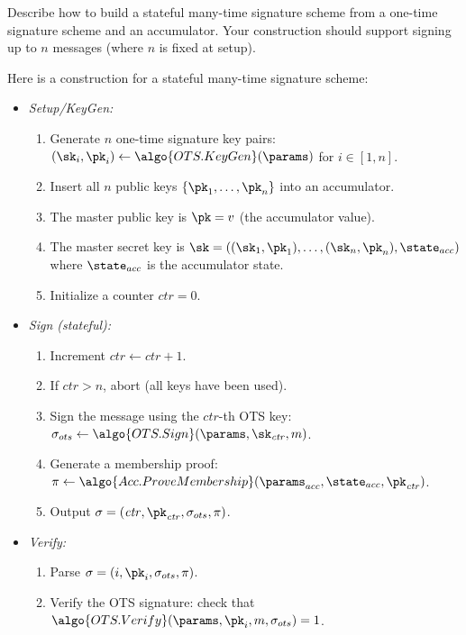 \begin{exercise}[Optional]
  Describe how to build a stateful many-time signature scheme from a one-time signature scheme and an accumulator.
  Your construction should support signing up to $n$ messages (where $n$ is fixed at setup).
\end{exercise}

\ifsolutions
\begin{mysolution}
  Here is a construction for a stateful many-time signature scheme:
  \begin{itemize}
    \item \emph{Setup/KeyGen:} 
      \begin{enumerate}
        \item Generate $n$ one-time signature key pairs: $(\sk_i, \pk_i) \gets \algo{OTS.KeyGen}(\params)$ for $i \in [1,n]$.
        \item Insert all $n$ public keys $\{\pk_1, \ldots, \pk_n\}$ into an accumulator.
        \item The master public key is $\pk = v$ (the accumulator value).
        \item The master secret key is $\sk = ((\sk_1, \pk_1), \ldots, (\sk_n, \pk_n), \state_{acc})$ where $\state_{acc}$ is the accumulator state.
        \item Initialize a counter $\mathit{ctr} = 0$.
      \end{enumerate}
    \item \emph{Sign (stateful):}
      \begin{enumerate}
        \item Increment $\mathit{ctr} \gets \mathit{ctr} + 1$.
        \item If $\mathit{ctr} > n$, abort (all keys have been used).
        \item Sign the message using the $\mathit{ctr}$-th OTS key: $\sigma_{ots} \gets \algo{OTS.Sign}(\params, \sk_{\mathit{ctr}}, m)$.
        \item Generate a membership proof: $\pi \gets \algo{Acc.ProveMembership}(\params_{acc}, \state_{acc}, \pk_{\mathit{ctr}})$.
        \item Output $\sigma = (\mathit{ctr}, \pk_{\mathit{ctr}}, \sigma_{ots}, \pi)$.
      \end{enumerate}
    \item \emph{Verify:}
      \begin{enumerate}
        \item Parse $\sigma = (i, \pk_i, \sigma_{ots}, \pi)$.
        \item Verify the OTS signature: check that $\algo{OTS.Verify}(\params, \pk_i, m, \sigma_{ots}) = 1$.

\end{enumerate}
\end{itemize}
\end{mysolution}
